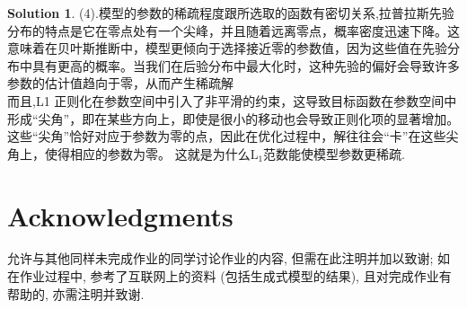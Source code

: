 \documentclass[a4paper,UTF8]{article}
\numberwithin{equation}{section}
\theoremstyle{definition}
\newtheorem*{solution}{Solution}
\begin{document}
\begin{solution}
(4).模型的参数的稀疏程度跟所选取的函数有密切关系,拉普拉斯先验分布的特点是它在零点处有一个尖峰，并且随着远离零点，概率密度迅速下降。这意味着在贝叶斯推断中，模型更倾向于选择接近零的参数值，因为这些值在先验分布中具有更高的概率。当我们在后验分布中最大化时，这种先验的偏好会导致许多参数的估计值趋向于零，从而产生稀疏解\\
而且,L1 正则化在参数空间中引入了非平滑的约束，这导致目标函数在参数空间中形成“尖角”，即在某些方向上，即使是很小的移动也会导致正则化项的显著增加。这些“尖角”恰好对应于参数为零的点，因此在优化过程中，解往往会“卡”在这些尖角上，使得相应的参数为零。
这就是为什么$\mathrm{L}_{1}$范数能使模型参数更稀疏.
\end{solution}

\newpage
\section*{Acknowledgments}
允许与其他同样未完成作业的同学讨论作业的内容, 但需在此注明并加以致谢; 如在作业过程中, 参考了互联网上的资料 (包括生成式模型的结果), 且对完成作业有帮助的, 亦需注明并致谢.
\end{document}
